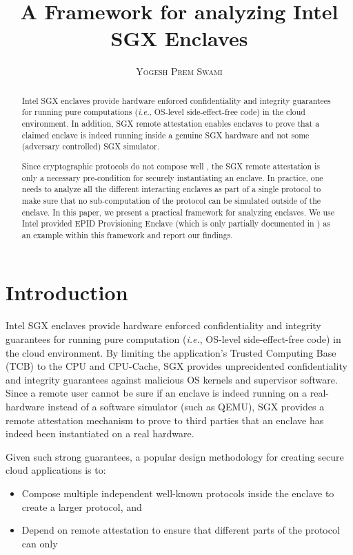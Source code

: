\documentclass[11pt]{article}
\title{\bf A Framework for analyzing Intel SGX Enclaves}
\author{\textsc{Yogesh Prem Swami}}
\date{\lastupdate}
\newcommand{\ie}{\textit{i.e.}}
\begin{document}

\maketitle

\begin{abstract}
  Intel SGX enclaves  provide hardware
  enforced confidentiality and integrity guarantees for running pure
  computations (\ie, OS-level side-effect-free code) in the cloud
  environment. In addition, SGX remote attestation enables
  enclaves to prove that a claimed enclave is indeed running inside a
  genuine SGX hardware and not some (adversary controlled) SGX
  simulator.

  Since cryptographic protocols do not compose well
  \cite{ucframework}, the SGX remote attestation is only a necessary
  pre-condition for securely instantiating an enclave. In practice,
  one needs to analyze all the different interacting enclaves as part of a
  single protocol to make sure that no sub-computation of the protocol
  can be simulated outside of the enclave. In this paper, we present a
  practical framework for analyzing enclaves. We use Intel provided
  EPID\cite{epid} Provisioning Enclave (which is  only partially
  documented in \cite{sgxattest}) as an example within this framework
  and report our findings.
\end{abstract}

\section{Introduction}
  Intel SGX enclaves\cite{sgxinnov, sgxinnov2} provide hardware
  enforced confidentiality and  integrity guarantees for running pure
  computation (\textit{i.e.}, OS-level side-effect-free code) in the
  cloud environment. By limiting the application's Trusted Computing
  Base (TCB) to the CPU and CPU-Cache, SGX provides unprecidented
  confidentiality and integrity guarantees against malicious OS
  kernels and supervisor software. Since a remote user cannot be sure
  if an enclave is indeed running on a real-hardware instead of a
  software simulator (such as QEMU), SGX provides a remote attestation
  mechanism to prove to third parties that an enclave has indeed been
  instantiated on a real hardware.

  Given such strong guarantees, a popular design methodology for
  creating secure cloud applications is to:

  \begin{itemize}
    \item Compose multiple independent well-known protocols inside the
      enclave to create a larger protocol, and

    \item Depend on remote attestation to ensure that different parts
      of the protocol can only
  \end{itemize}
\end{document}

